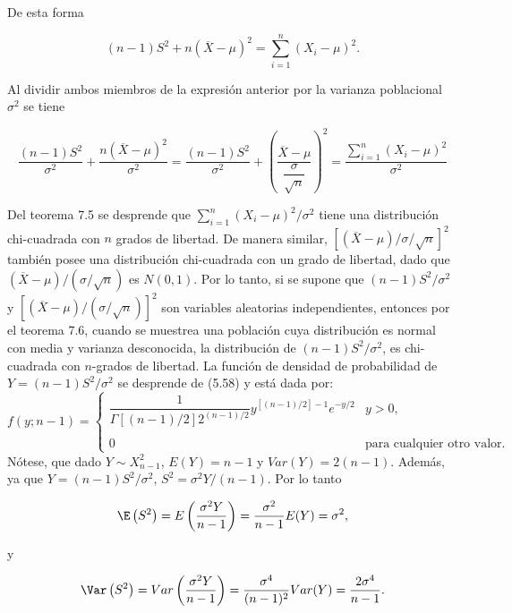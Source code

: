 De esta forma

$$(n-1)S^2+n\left(\overline{X}-\mu\right)^2=\sum_{i=1}^n \left(X_i-\mu\right)^2.$$

Al dividir ambos miembros de la expresión anterior por la varianza poblacional $\sigma^2$ se tiene

\begin{tcolorbox}
    $$\dfrac{(n-1)S^2}{\sigma^2}+\dfrac{n\left(\overline{X}-\mu\right)^2}{\sigma^2}=\dfrac{(n-1)S^2}{\sigma^2}+\left(\dfrac{\overline{X}-\mu}{\dfrac{\sigma}{\sqrt{n}}}\right)^2=\dfrac{\displaystyle\sum_{i=1}^n \left(X_i-\mu\right)^2}{\sigma^2}$$
\end{tcolorbox}

Del teorema 7.5 se desprende que $\sum_{i=1}^n (X_i-\mu)^2/\sigma^2$ tiene una distribución chi-cuadrada con $n$ grados de libertad. De manera similar, $\left[(\overline{X}-\mu)/\sigma/\sqrt{n}\right]^2$ también posee una distribución chi-cuadrada con un grado de libertad, dado que $(\overline{X}-\mu)/(\sigma/\sqrt{n})$ es $N(0,1)$. Por lo tanto, si se supone que $(n-1)S^2/\sigma^2$ y $\left[(\overline{X}-\mu)/(\sigma/\sqrt{n})\right]^2$ son variables aleatorias independientes, entonces por el teorema 7.6, cuando se muestrea una población cuya distribución es normal con media y varianza desconocida, la distribución de $(n-1)S^2/\sigma^2$, es chi-cuadrada con $n$-grados de libertad. La función de densidad de probabilidad de $Y=(n-1)S^2/\sigma^2$ se desprende de (5.58) y está dada por:
$$
f(y;n-1)=
\left\{
    \begin{array}{lc}
	\dfrac{1}{\Gamma\left[(n-1)/2\right]2^{(n-1)/2}}y^{\left[(n-1)/2\right]-1}e^{-y/2} & y>0,\\\\
	0&\mbox{para cualquier otro valor.}
    \end{array}
\right.
$$
Nótese, que dado $Y\sim X_{n-1}^2$, $E(Y)=n-1$ y $Var(Y)=2(n-1)$. Además, ya que $Y=(n-1)S^2/\sigma^2$, $S^2=\sigma^2Y/(n-1)$. Por lo tanto
\begin{tcolorbox}
    $$\E\left(S^2\right)=E\left(\dfrac{\sigma^2 Y}{n-1}\right)=\dfrac{\sigma^2}{n-1}E(Y)=\sigma^2,$$
\end{tcolorbox}

y 

\begin{tcolorbox}
    $$\Var\left(S^2\right)=Var\left(\dfrac{\sigma^2Y}{n-1}\right)=\dfrac{\sigma^4}{(n-1)^2}Var(Y)=\dfrac{2\sigma^4}{n-1}.$$
\end{tcolorbox}


